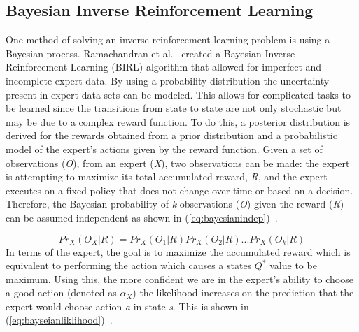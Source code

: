 \documentclass[12pt,american]{report}
\begin{document}
\subsection{Bayesian Inverse Reinforcement Learning}
One method of solving an inverse reinforcement learning problem is using a Bayesian process. Ramachandran et al.~\cite{ramachandran2007bayesian} created a Bayesian Inverse Reinforcement Learning (BIRL) algorithm that allowed for imperfect and incomplete expert data.  By using a probability distribution the uncertainty present in expert data sets can be modeled. This allows for complicated tasks to be learned since the transitions from state to state are not only stochastic but may be due to a complex reward function. To do this, a posterior distribution is derived for the rewards obtained from a prior distribution and a probabilistic model of the expert's actions given by the reward function.  Given a set of observations (\textit{O}), from an expert (\textit{X}), two observations can be made: the expert is attempting to maximize its total accumulated reward, \textit{R}, and the expert executes on a fixed policy that does not change over time or based on a decision. Therefore, the Bayesian probability of \textit{k} observations (\textit{O}) given the reward (\textit{R}) can be assumed independent as shown in (\ref{eq:bayesianindep})~\cite{ramachandran2007bayesian}.

\begin{equation}
            \label{eq:bayesianindep}
            Pr_X(O_X|R) = Pr_X(O_1|R)Pr_X(O_2|R)...Pr_X(O_k|R)%
        \end{equation}
In terms of the expert, the goal is to maximize the accumulated reward which is equivalent to performing the action which causes a states \textit{$Q^*$} value to be maximum. Using this, the more confident we are in the expert's ability to choose a good action (denoted as $\alpha_X$) the likelihood increases on the prediction that the expert would choose action \textit{a} in state \textit{s}.  This is shown in (\ref{eq:bayseianliklihood})~\cite{ramachandran2007bayesian}.
\end{document}
